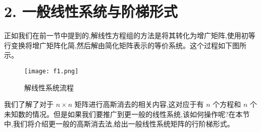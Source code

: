 \documentclass[10pt, a4paper]{article}
\begin{document}



\section*{2. 一般线性系统与阶梯形式}
正如我们在前一节中提到的,解线性方程组的方法是将其转化为增广矩阵,使用初等行变换将增广矩阵化简,然后解由简化矩阵表示的等价系统。这个过程如下图所示。

\begin{figure}[h]
    \centering
    \texttt{[image: f1.png]} %
    \caption{解线性系统流程}
    \label{fig:linear_system_process}
\end{figure}

我们了解了对于 \(n \times n\) 矩阵进行高斯消去的相关内容,这对应于有 \(n\) 个方程和 \(n\) 个未知数的情况。但是如果我们要推广到更一般的线性系统,该如何操作呢?在本节中,我们将介绍更一般的高斯消去法,给出一般线性系统矩阵的行阶梯形式。
\end{document}
